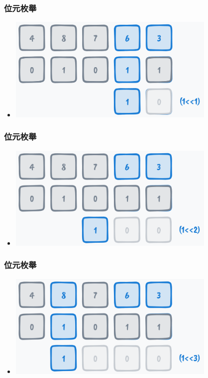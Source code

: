 \documentclass{beamer}
\begin{document}
\begin{frame}
    \frametitle{位元枚舉}
    \begin{itemize}
        \item \includegraphics[width=10.0cm]{img/img_6.png}
    \end{itemize}
\end{frame}

\begin{frame}
    \frametitle{位元枚舉}
    \begin{itemize}
        \item \includegraphics[width=10.0cm]{img/img_7.png}
    \end{itemize}
\end{frame}

\begin{frame}
    \frametitle{位元枚舉}
    \begin{itemize}
        \item \includegraphics[width=10.0cm]{img/img_8.png}
    \end{itemize}
\end{frame}
\end{document}
